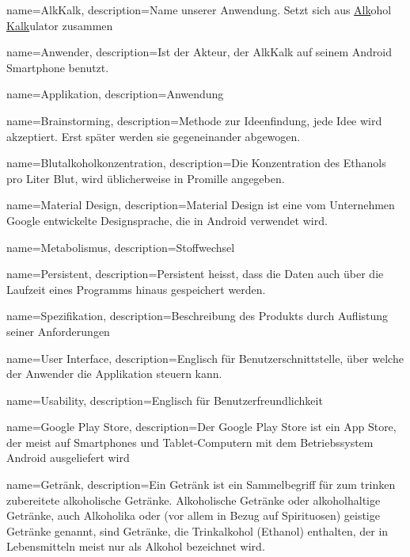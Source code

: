 {
  name=AlkKalk,
  description={Name unserer Anwendung. Setzt sich aus
			\underline{Alk}ohol \underline{Kalk}ulator zusammen}
}

{
  name=Anwender,
  description={Ist der Akteur, der AlkKalk auf seinem Android Smartphone benutzt.}
}

{
  name=Applikation,
  description={Anwendung}
}

{
  name=Brainstorming,
  description={Methode zur Ideenfindung, jede Idee wird
akzeptiert. Erst später werden sie gegeneinander abgewogen.}
}

{
  name=Blutalkoholkonzentration,
  description={Die Konzentration des Ethanols pro Liter Blut,
    wird üblicherweise in Promille angegeben.}
}

{
  name=Material Design,
  description={Material Design ist eine vom Unternehmen Google entwickelte Designsprache,
    die in Android verwendet wird.}
}

{
  name=Metabolismus,
  description={Stoffwechsel}
}

{
  name=Persistent,
  description={Persistent heisst, dass die Daten auch über die Laufzeit
    eines Programms hinaus gespeichert werden.}
}

{
  name=Spezifikation,
  description={Beschreibung des Produkts durch Auflistung seiner Anforderungen}
}

{
  name=User Interface,
  description={Englisch für Benutzerschnittstelle,
    über welche der Anwender die Applikation steuern kann.}
}

{
  name=Usability,
  description={Englisch für Benutzerfreundlichkeit}
}

{
  name=Google Play Store,
  description={Der Google Play Store ist ein App Store, der meist auf
    Smartphones und Tablet-Computern mit dem Betriebssystem Android ausgeliefert wird}
}

{
  name=Getränk,
  description={Ein Getränk ist ein Sammelbegriff für zum trinken zubereitete alkoholische Getränke. Alkoholische Getränke oder alkoholhaltige Getränke, auch Alkoholika oder (vor allem in Bezug auf Spirituosen) geistige Getränke genannt, sind Getränke, die Trinkalkohol (Ethanol) enthalten, der in Lebensmitteln meist nur als Alkohol bezeichnet wird.}
}


